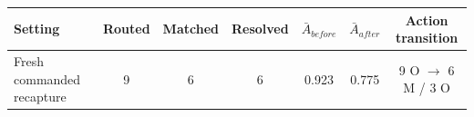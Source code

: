 \begin{tabular}{lcccccc}
\toprule
Setting & Routed & Matched & Resolved & $\bar{A}_{before}$ & $\bar{A}_{after}$ & Action transition \\
\midrule
Fresh commanded recapture & 9 & 6 & 6 & 0.923 & 0.775 & 9 O $\rightarrow$ 6 M / 3 O \\
\bottomrule
\end{tabular}
